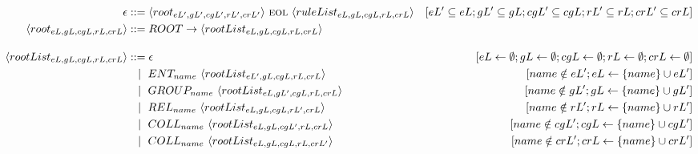 \begin{landscape}
    \centering
    \begin{adjustbox}{max width=\linewidth,max height=.95\textheight,valign=c}
        \parbox{\linewidth}{\begin{align}
                \epsilon                                     & ::= \langle root_{eL',gL',cgL',rL',crL'} \rangle ~\textsc{eol}~ \langle ruleList_{eL,gL,cgL,rL,crL} \rangle  & [eL' \subseteq eL; gL' \subseteq gL; cgL' \subseteq cgL; rL' \subseteq rL; crL' \subseteq crL]         \\
                \langle root_{eL,gL,cgL,rL,crL} \rangle      & ::= ROOT \to \langle rootList_{eL,gL,cgL,rL,crL} \rangle                                                                                                                                                              \\[1em]
                \langle rootList_{eL,gL,cgL,rL,crL}  \rangle & ::= \epsilon                                                                                                 & [eL \gets \emptyset; gL \gets \emptyset; cgL \gets \emptyset; rL \gets \emptyset; crL \gets \emptyset] \\
                                                             & ~~ \mid ~  ENT_{name}   ~ \langle rootList_{eL',gL,cgL,rL,crL} \rangle                                       & [name \notin eL'; eL \gets \{name\} \cup eL']                                                          \\
                                                             & ~~ \mid ~  GROUP_{name} ~ \langle rootList_{eL,gL',cgL,rL,crL} \rangle                                       & [name \notin gL'; gL \gets \{name\} \cup gL']                                                          \\
                                                             & ~~ \mid ~  REL_{name}   ~ \langle rootList_{eL,gL,cgL,rL',crL} \rangle                                       & [name \notin rL'; rL \gets \{name\} \cup rL']                                                          \\
                                                             & ~~ \mid ~  COLL_{name}  ~ \langle rootList_{eL,gL,cgL',rL,crL} \rangle                                       & [name \notin cgL'; cgL \gets \{name\} \cup cgL']                                                       \\
                                                             & ~~ \mid ~  COLL_{name}  ~ \langle rootList_{eL,gL,cgL,rL,crL'} \rangle                                       & [name \notin crL'; crL \gets \{name\} \cup crL']                                                       \\[1em]

\end{align}}
\end{adjustbox}
\end{landscape}
